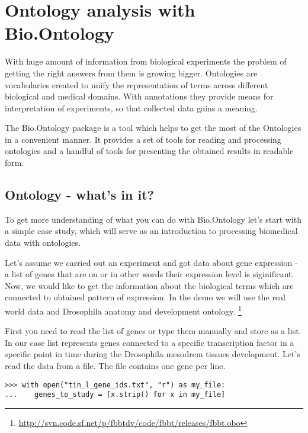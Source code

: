\chapter{Ontology analysis with Bio.Ontology}

\label{sec:Ontology}

With huge amount of information from biological experiments the problem of
getting the right answers from them is growing bigger. Ontologies are
vocabularies created to unify the representation of terms across different
biological and medical domains. With annotations they provide means for
interpretation of experiments, so that collected data gains a meaning.

The Bio.Ontology package is a tool which helps to get the most of the
Ontologies in a convenient manner. It provides a set of tools for reading
and processing ontologies and a handful of tools for presenting the obtained
results in readable form.

\section{Ontology - what's in it?}
\label{sec:demo}

To get more understanding of what you can do with Bio.Ontology let's start with
a simple case study, which will serve as an introduction to processing
biomedical data with ontologies. 

Let's assume we carried out an experiment and got data about gene expression -
a list of genes that are on or in other words their expression level is
siginificant. Now, we would like to get the
information about the biological terms which are connected to obtained pattern
of expression. In the demo we will use the real world data and Drosophila anatomy and development ontology.
\footnote{\url{http://svn.code.sf.net/p/fbbtdv/code/fbbt/releases/fbbt.obo}}

First you need to read the list of genes or type them manually and store as
a list. In our case list represents genes connected to a specific transcription
factor in a specific point in time during the Drosophila mesodrem tissues development.
Let's read the data from a file. The file contains one gene per line.

\begin{verbatim}
>>> with open("tin_l_gene_ids.txt", "r") as my_file:
...    genes_to_study = [x.strip() for x in my_file]

\end{verbatim}

